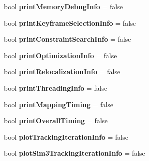 \begin{DoxyCompactItemize}
\item 
\hypertarget{namespacelsd__slam_a789262d55df01aafe88711486485220c}{bool {\bfseries print\-Memory\-Debug\-Info} = false}\label{namespacelsd__slam_a789262d55df01aafe88711486485220c}

\item 
\hypertarget{namespacelsd__slam_ae40f1b805b41b861c2afcc27f56eed8a}{bool {\bfseries print\-Keyframe\-Selection\-Info} = false}\label{namespacelsd__slam_ae40f1b805b41b861c2afcc27f56eed8a}

\item 
\hypertarget{namespacelsd__slam_abdb5527307a4ef838531f379a775eb71}{bool {\bfseries print\-Constraint\-Search\-Info} = false}\label{namespacelsd__slam_abdb5527307a4ef838531f379a775eb71}

\item 
\hypertarget{namespacelsd__slam_a30b599417e86d7d202594ce134ed3976}{bool {\bfseries print\-Optimization\-Info} = false}\label{namespacelsd__slam_a30b599417e86d7d202594ce134ed3976}

\item 
\hypertarget{namespacelsd__slam_ab048b8b0b27d89cf72b5a2051564b28d}{bool {\bfseries print\-Relocalization\-Info} = false}\label{namespacelsd__slam_ab048b8b0b27d89cf72b5a2051564b28d}

\item 
\hypertarget{namespacelsd__slam_a88c793b2dfff5f827eee0ed5842bda3a}{bool {\bfseries print\-Threading\-Info} = false}\label{namespacelsd__slam_a88c793b2dfff5f827eee0ed5842bda3a}

\item 
\hypertarget{namespacelsd__slam_a0937f9a26f5d259ddef6865ee1f82994}{bool {\bfseries print\-Mapping\-Timing} = false}\label{namespacelsd__slam_a0937f9a26f5d259ddef6865ee1f82994}

\item 
\hypertarget{namespacelsd__slam_a09ad3524610e55a17bb638d091288a86}{bool {\bfseries print\-Overall\-Timing} = false}\label{namespacelsd__slam_a09ad3524610e55a17bb638d091288a86}

\item 
\hypertarget{namespacelsd__slam_a72c8d072545302c59798ac86c58c17e2}{bool {\bfseries plot\-Tracking\-Iteration\-Info} = false}\label{namespacelsd__slam_a72c8d072545302c59798ac86c58c17e2}

\item 
\hypertarget{namespacelsd__slam_ad9f8b62563fb33f39b2e292f9baae3b3}{bool {\bfseries plot\-Sim3\-Tracking\-Iteration\-Info} = false}\label{namespacelsd__slam_ad9f8b62563fb33f39b2e292f9baae3b3}


\end{DoxyCompactItemize}
